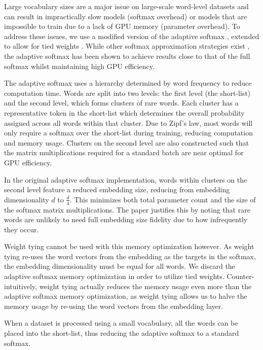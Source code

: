 \documentclass{article}
\begin{document}
Large vocabulary sizes are a major issue on large-scale word-level datasets and can result in impractically slow models (softmax overhead) or models that are impossible to train due to a lack of GPU memory (parameter overhead).
To address these issues, we use a modified version of the adaptive softmax \citep{grave2016efficient}, extended to allow for tied weights \cite{Inan2016,Press2016}.
While other softmax approximation strategies exist \citep{morin,nce}, the adaptive softmax has been shown to achieve results close to that of the full softmax whilst maintaining high GPU efficiency.

The adaptive softmax uses a hierarchy determined by word frequency to reduce computation time.
Words are split into two levels: the first level (the short-list) and the second level, which forms clusters of rare words.
Each cluster has a representative token in the short-list which determines the overall probability assigned across all words within that cluster.
Due to Zipf's law, most words will only require a softmax over the short-list during training, reducing computation and memory usage.
Clusters on the second level are also constructed such that the matrix multiplications required for a standard batch are near optimal for GPU efficiency.

In the original adaptive softmax implementation, words within clusters on the second level feature a reduced embedding size, reducing from embedding dimensionality $d$ to $\frac{d}{4}$.
This minimizes both total parameter count and the size of the softmax matrix multiplications.
The paper justifies this by noting that rare words are unlikely to need full embedding size fidelity due to how infrequently they occur.

Weight tying cannot be used with this memory optimization however.
As weight tying re-uses the word vectors from the embedding as the targets in the softmax, the embedding dimensionality must be equal for all words.
We discard the adaptive softmax memory optimization in order to utilize tied weights.
Counter-intuitively, weight tying actually reduces the memory usage even more than the adaptive softmax memory optimization, as weight tying allows us to halve the memory usage by re-using the word vectors from the embedding layer.

When a dataset is processed using a small vocabulary, all the words can be placed into the short-list, thus reducing the adaptive softmax to a standard softmax.
\end{document}
